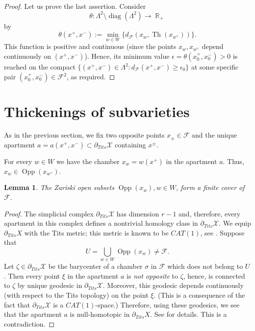 \documentclass[12pt]{amsbook}%
\newtheorem{lem}[thm]{Lemma}
\theoremstyle{definition}
\theoremstyle{remark}
\numberwithin{section}{chapter}
\numberwithin{subsection}{section}
\numberwithin{figure}{chapter}
\DeclareMathOperator{\Th}{Th}
\DeclareMathOperator{\Opp}{Opp}
\DeclareMathOperator{\R}{\mathbb{R}}
\DeclareMathOperator{\diag}{diag}
\def\tits{\partial_{Tits}}
\def\eps{\epsilon}
\def\dF{d_{\mathcal{F}}}
\def\cF{{\mathscr{F}}}
\def\cP{{\mathscr{P}}}
\def\cX{{\mathscr{X}}}
\def\La{\Lambda}
\begin{document}
{{\begin{proof}
Let us prove the last assertion. Consider 
$$
\theta: \La^2\setminus \diag(\La^2) \to \R_+
$$
by
$$
\theta(x^+, x^-):=\min_{w \in W} \{d_{\cF}(x_w, \Th(x_{w^\vee}))\}.
$$
This function is positive and continuous (since the points $x_w, x_{w^\vee}$ depend continuously on $(x^+, x^-)$). 
Hence, its minimum value $\eps = \theta(x_0^+, x_0^-) >0$ is reached on 
the compact $\{(x^+, x^-)\in \La^2: \dF(x^+, x^-)\geqslant \eps_0\}$ at some specific pair $(x_0^+ , x_0^-) \in \cF^2$, as required. \end{proof} 



\section{Thickenings of subvarieties}


As in the previous section, we fix two opposite points $x_\pm\in \cF$ and the unique apartment $a=a(x^+, x^-)\subset \tits \cX$ containing $x^\pm$. 

For every $w\in W$ we have 
the chamber $x_w=w(x^+)$ in the apartment $a$. Thus,  
$x_w\in \Opp(x_{w^\vee})$. 

\begin{lem}\label{lem:opp-cover}
The Zariski open subsets $\Opp(x_w), w\in W$, form a finite cover of $\cF$. 
\end{lem}
\begin{proof}  The simplicial complex $\tits \cX$ has dimension $r-1$ and, therefore, every apartment in this complex 
defines a nontrivial homology class in $\tits \cX$. We equip 
$\tits X$ with the Tits metric; this metric is known to be $CAT(1)$, see \cite[Lemma 4.12]{BGS}. 
Suppose that  
$$
U=\bigcup_{w\in W} \Opp(x_w) \ne \cF.  
$$
Let  $\zeta\in \tits \cX$ be the barycenter of a chamber $\sigma$ in $\cF$ which does not belong to $U$. 
Then every point $\xi$ in the apartment $a$ is {\em not opposite} to $\zeta$, hence, is 
connected to $\zeta$ by unique geodesic in $\tits \cX$. Moreover,  this geodesic  depends continuously (with respect to the Tits topology) 
on the point $\xi$. (This is a consequence of the fact that $\tits \cX$ is a $CAT(1)$-space.) 
Therefore, using these geodesics, we see that the apartment $a$ is null-homotopic in $\tits X$. See \cite{Solomon} for 
details. This is a contradiction. 
\end{proof}



}}
\end{document}
